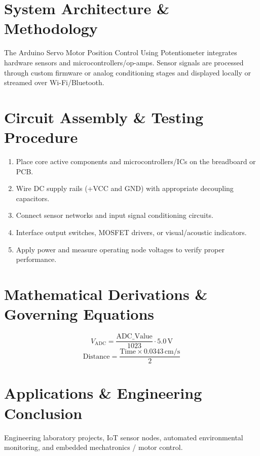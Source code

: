 \documentclass[11pt,a4paper]{article}
\begin{document}
\section{System Architecture \& Methodology}
The Arduino Servo Motor Position Control Using Potentiometer integrates hardware sensors and microcontrollers/op-amps. Sensor signals are processed through custom firmware or analog conditioning stages and displayed locally or streamed over Wi-Fi/Bluetooth.

\section{Circuit Assembly \& Testing Procedure}
\begin{enumerate}
    \item Place core active components and microcontrollers/ICs on the breadboard or PCB.
    \item Wire DC supply rails (+VCC and GND) with appropriate decoupling capacitors.
    \item Connect sensor networks and input signal conditioning circuits.
    \item Interface output switches, MOSFET drivers, or visual/acoustic indicators.
    \item Apply power and measure operating node voltages to verify proper performance.
\end{enumerate}

\section{Mathematical Derivations \& Governing Equations}
\begin{equation}
V_{\text{ADC}} = \frac{\text{ADC\_Value}}{1023} \cdot 5.0\,\text{V}
\end{equation}
\begin{equation}
\text{Distance} = \frac{\text{Time} \times 0.0343\,\text{cm/s}}{2}
\end{equation}

\section{Applications \& Engineering Conclusion}
Engineering laboratory projects, IoT sensor nodes, automated environmental monitoring, and embedded mechatronics / motor control.
\end{document}
